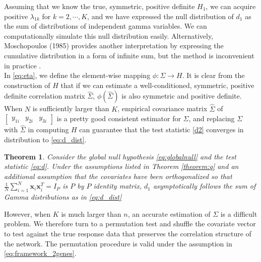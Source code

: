 \documentclass[aoas,preprint]{imsart}
\newtheorem{theorem}{Theorem}
\numberwithin{equation}{section}
\theoremstyle{plain}
\begin{document}
Assuming that we know the true, symmetric, positive definite $H_1$, we can acquire positive $\lambda_{1k}$ for $k = 2, \cdots, K$, and we have expressed the null distribution of $d_1$ as the sum of distributions of independent gamma variables. We can computationally simulate this null distribution easily. Alternatively, Moschopoulos (1985) provides another interpretation by expressing the cumulative distribution in a form of infinite sum, but the method is inconvenient in practice \cite{moschopoulos1985distribution}.\\

In \ref{eq:eta}, we define the element-wise mapping $\phi: \Sigma \rightarrow H$. It is clear from the construction of $H$ that if we can estimate a well-conditioned, symmetric, positive definite correlation matrix $\hat{\Sigma}$, $\phi(\hat{\Sigma})$ is also symmetric and positive definite. When $N$ is sufficiently larger than $K$, empirical covariance matrix $\hat{\Sigma}$ of $\begin{bmatrix} y_{1i} & y_{2i} & y_{3i} \end{bmatrix}$ is a pretty good consistent estimator for $\Sigma$, and replacing $\Sigma$ with $\hat{\Sigma}$ in computing $H$ can guarantee that the test statistic \ref{d2} converges in distribution to \ref{eq:d_dist}.\\
\begin{theorem}
Consider the global null hypothesis \ref{eq:globalnull} and the test statistic \ref{eq:d}. Under the assumptions listed in Theorem \ref{theorem:q} and an additional assumption that the covariates have been orthogonalized so that $\frac{1}{N} \sum_{i=1}^{N} \bm{x}_i\bm{x}_i^T = I_P$ is $P$ by $P$ identity matrix, $d_1$ asymptotically follows the sum of Gamma distributions as in \ref{eq:d_dist}
\end{theorem}
However, when $K$ is much larger than $n$, an accurate estimation of $\Sigma$ is a difficult problem. We therefore turn to a permutation test and shuffle the covariate vector to test against the true response data that preserves the correlation structure of the network. The permutation procedure is valid under the assumption in \ref{eq:framework_2genes}. \\
\end{document}
